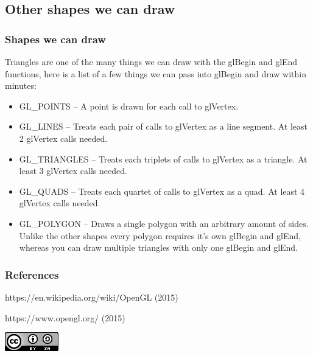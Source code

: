 \documentclass{beamer}
\begin{document}
          \subsection{Other shapes we can draw}
          \begin{frame}
            \frametitle{Shapes we can draw}
            Triangles are one of the many things we can draw with the glBegin and glEnd functions, here is a list of a few things we can pass into glBegin and draw within minutes:\\
            \begin{itemize}
            \item{GL\_POINTS} -- A point is drawn for each call to glVertex.
            \item{GL\_LINES} -- Treats each pair of calls to glVertex as a line segment. At least 2 glVertex calls needed.
            \item{GL\_TRIANGLES} -- Treats each triplets of calls to glVertex as a triangle. At least 3 glVertex calls needed.  \item{GL\_QUADS} -- Treats each quartet of calls to glVertex as a quad. At least 4 glVertex calls needed.
            \item{GL\_POLYGON} -- Draws a single polygon with an arbitrary amount of sides. Unlike the other shapes every polygon requires it's own glBegin and glEnd, whereas you can draw multiple triangles with only one glBegin and glEnd.
            \end{itemize}
          \end{frame}

          \begin{frame}
            \frametitle{References}
            \footnotesize{
              \begin{thebibliography}{99}
               https://en.wikipedia.org/wiki/OpenGL (2015)

               https://www.opengl.org/ (2015)
              \end{thebibliography}
            }
            \includegraphics[scale=.33]{../cc.png}

          \end{frame}


          
\end{document}
